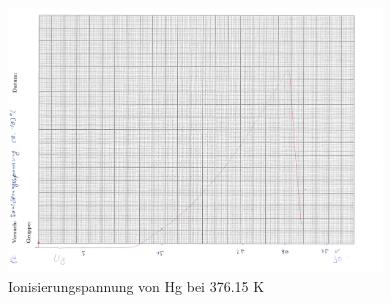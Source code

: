 \begin{figure}
  \centering
  \includegraphics[height=7cm]{8c.png}
  \caption{Ionisierungspannung von Hg bei 376.15 K}
  \label{fig:8c}
\end{figure}
